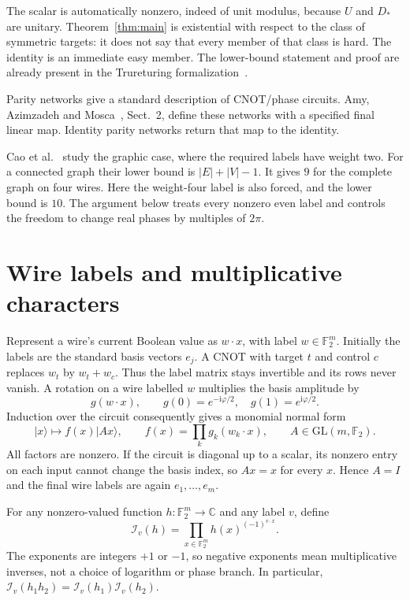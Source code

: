\documentclass[11pt]{article}
\newcommand{\F}{\mathbb F_2}
\begin{document}
The scalar is automatically nonzero, indeed of unit modulus, because
$U$ and $D_*$ are unitary. Theorem~\ref{thm:main} is existential with
respect to the class of symmetric targets: it does not say that every
member of that class is hard. The identity is an immediate easy member.
The lower-bound statement and proof are already present in the
Trureturing formalization~\cite{upstream}.

Parity networks give a standard description of CNOT/phase circuits.
Amy, Azimzadeh and Mosca~\cite{AAM}, Sect.~2, define these networks
with a specified final linear map. Identity parity networks return
that map to the identity.

Cao et al.~\cite{CLNST} study the graphic case, where the required
labels have weight two. For a connected graph their lower bound is
$|E|+|V|-1$. It gives $9$ for the complete graph on four wires.
Here the weight-four label is also forced, and the lower bound is $10$.
The argument below treats every nonzero even label and controls
the freedom to change real phases by multiples of $2\pi$.

\section{Wire labels and multiplicative characters}
Represent a wire's current Boolean value as $w\cdot x$, with label
$w\in\F^m$. Initially the labels are the standard basis vectors $e_j$.
A CNOT with target $t$ and control $c$ replaces $w_t$ by $w_t+w_c$.
Thus the label matrix stays invertible and its rows never vanish.
A rotation on a wire labelled $w$ multiplies the basis amplitude by
\[
 g(w\cdot x),\qquad g(0)=e^{-\mathrm i\varphi/2},\quad
 g(1)=e^{\mathrm i\varphi/2}.
\]
Induction over the circuit consequently gives a monomial normal form
\[
 |x\rangle\longmapsto f(x)|Ax\rangle,\qquad
 f(x)=\prod_k g_k(w_k\cdot x),\qquad A\in\mathrm{GL}(m,\F).
\]
All factors are nonzero. If the circuit is diagonal up to a scalar,
its nonzero entry on each input cannot change the basis index, so
$Ax=x$ for every $x$. Hence $A=I$ and the final wire labels are again
$e_1,\ldots,e_m$.

For any nonzero-valued function $h:\F^m\to\mathbb C$ and any label $v$,
define
\[
 \mathcal I_v(h)=\prod_{x\in\F^m}h(x)^{(-1)^{v\cdot x}}.
\]
The exponents are integers $+1$ or $-1$, so negative exponents mean
multiplicative inverses, not a choice of logarithm or phase branch.
In particular, $\mathcal I_v(h_1h_2)=\mathcal I_v(h_1)\mathcal I_v(h_2)$.
\end{document}
